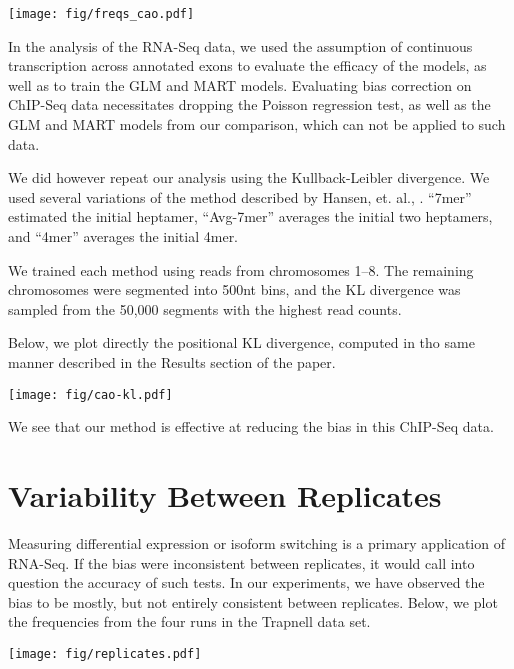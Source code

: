 \documentclass[letterpaper]{article}
\begin{document}
\begin{center}
\texttt{[image: fig/freqs\_cao.pdf]}
\end{center}

In the analysis of the RNA-Seq data, we used the assumption of continuous
transcription across annotated exons to evaluate the efficacy of the models, as
well as to train the GLM and MART models. Evaluating bias correction on ChIP-Seq
data necessitates dropping the Poisson regression test, as well as the GLM and
MART models from our comparison, which can not be applied to such data.

We did however repeat our analysis using the Kullback-Leibler divergence.
We used several variations of the method described by Hansen, et. al.,
\cite{Hansen2010}. ``7mer'' estimated the initial heptamer, ``Avg-7mer''
averages the initial two heptamers, and ``4mer'' averages the initial 4mer.

We trained each method using reads from chromosomes 1--8. The
remaining chromosomes were segmented into 500nt bins, and the KL divergence was
sampled from the 50,000 segments with the highest read counts.

Below, we plot directly the positional KL divergence, computed in tho same
manner described in the Results section of the paper.

\begin{center}
\texttt{[image: fig/cao-kl.pdf]}
\end{center}

We see that our method is effective at reducing the bias in this ChIP-Seq data.



\section{Variability Between Replicates}

Measuring differential expression or isoform switching is a primary application of
RNA-Seq. If the bias were inconsistent between replicates, it would call into
question the accuracy of such tests. In our experiments, we have observed the
bias to be mostly, but not entirely consistent between replicates. Below, we
plot the frequencies from the four runs in the Trapnell data set.

\begin{center}
\texttt{[image: fig/replicates.pdf]}
\end{center}
\end{document}
